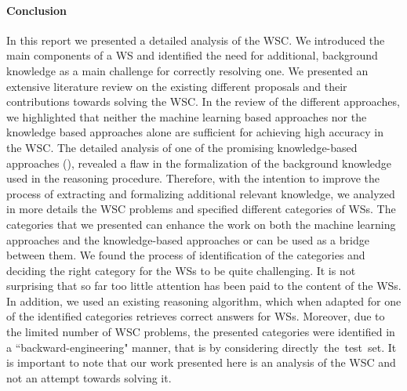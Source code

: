 
\paragraph{Conclusion}
In this report we presented a detailed analysis of the WSC. We introduced the main components of a WS and identified the need for additional, background knowledge as a main challenge for correctly resolving one. We presented an extensive literature review on the existing different proposals and their contributions towards solving the WSC. In the review of the different approaches, we highlighted that neither the machine learning based approaches nor the knowledge based approaches alone are sufficient for achieving high accuracy in the WSC. The detailed analysis of one of the promising knowledge-based approaches (\cite{2018CommonsenseKT}), revealed a flaw in the formalization of the background knowledge used in the reasoning procedure. Therefore, with the intention to improve the process of extracting and formalizing additional relevant knowledge, we analyzed in more details the WSC problems and specified different categories of WSs. The categories that we presented can enhance the work on both the machine learning approaches and the knowledge-based approaches or can be used as a bridge between them. We found the process of identification of the categories and deciding the right category for the WSs to be quite challenging. It is not surprising that so far too little attention has been paid to the content of the WSs. In addition, we used an existing reasoning algorithm, which when adapted for one of the identified categories retrieves correct answers for WSs. 
Moreover, due to the limited number of WSC problems, the presented categories were identified in a ``backward-engineering" manner, that is by considering directly~the~test~set. It is important to note that our work presented here is an analysis of the WSC and not an attempt towards solving it.

